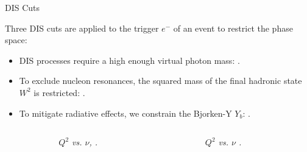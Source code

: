 \begin{frame}{DIS Cuts}
    \label{11.22::dis_cuts}

    Three DIS cuts are applied to the trigger $e^-$ of an event to restrict the phase space:

    \begin{itemize}
        \item
            DIS processes require a high enough virtual photon mass: .

        \item
            To exclude nucleon resonances, the squared mass of the final hadronic state $W^2$ is restricted: .

        \item
            To mitigate radiative effects, we constrain the Bjorken-Y $Y_b$: .
    \end{itemize}

    \vspace{-18pt}

    \begin{columns}[onlytextwidth,T]

    \begin{column}{.05\linewidth}\end{column} %

    \begin{column}{.44\linewidth}
        \begin{center}
            \begin{figure}[t]
                \scriptsize{\textit{$Q^2$ vs. $\nu$, .}}
            \end{figure}
        \end{center}
    \end{column}

    \begin{column}{.015\linewidth}\end{column} %

    \begin{column}{.44\linewidth}
        \begin{center}
            \begin{figure}[t]
                \scriptsize{\textit{$Q^2$ vs. $\nu$ .}}
            \end{figure}
        \end{center}
    \end{column}

    \begin{column}{.05\linewidth}\end{column} %

    \end{columns}
\end{frame}

